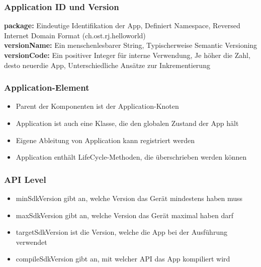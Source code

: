 \subsubsection{Application ID und Version}
\textbf{package:} Eindeutige Identifikation der App, Definiert Namespace, Reversed Internet Domain Format (ch.ost.rj.helloworld)\\
\textbf{versionName:} Ein menschenlesbarer String, Typischerweise Semantic Versioning\\
\textbf{versionCode:} Ein positiver Integer für interne Verwendung, Je höher die Zahl, desto \dq neuer\dq die App, Unterschiedliche Ansätze zur Inkrementierung
\subsubsection{Application-Element}
\begin{itemize}[topsep=0pt, leftmargin=4mm]
    \setlength\itemsep{-0.3em}
    \item Parent der Komponenten ist der Application-Knoten
    \item Application ist auch eine Klasse, die den globalen Zustand der App hält
    \item Eigene Ableitung von Application kann registriert werden
    \item Application enthält LifeCycle-Methoden, die überschrieben werden können
\end{itemize}
\subsubsection{API Level}
\begin{itemize}[topsep=0pt, leftmargin=4mm]
    \setlength\itemsep{-0.3em}
    \item minSdkVersion gibt an, welche Version das Gerät mindestens haben muss
    \item maxSdkVersion gibt an, welche Version das Gerät maximal haben darf
    \item targetSdkVersion ist die Version, welche die App bei der Ausführung verwendet
    \item compileSdkVersion gibt an, mit welcher API das App kompiliert wird
\end{itemize}